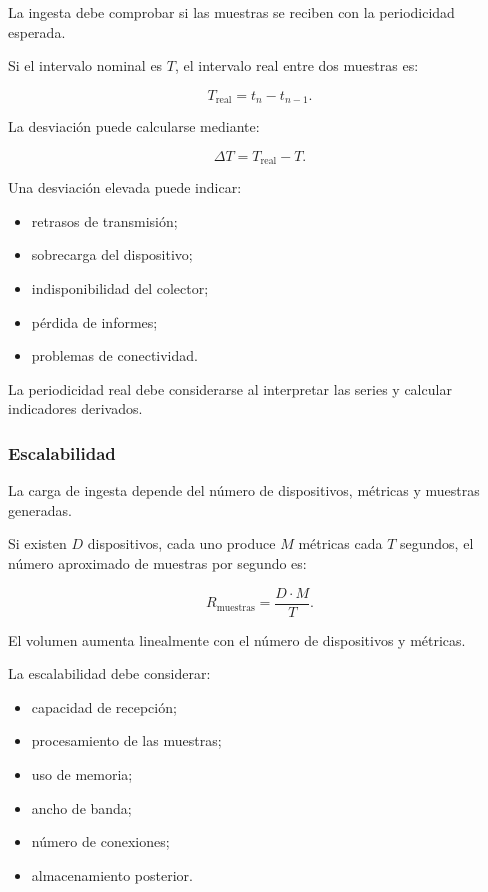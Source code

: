 La ingesta debe comprobar si las muestras se reciben con la periodicidad
esperada.

Si el intervalo nominal es \(T\), el intervalo real entre dos muestras
es:

\[
    T_{\mathrm{real}}
    =
    t_n
    -
    t_{n-1}.
\]

La desviación puede calcularse mediante:

\[
    \Delta T
    =
    T_{\mathrm{real}}
    -
    T.
\]

Una desviación elevada puede indicar:

\begin{itemize}
    \item retrasos de transmisión;

    \item sobrecarga del dispositivo;

    \item indisponibilidad del colector;

    \item pérdida de informes;

    \item problemas de conectividad.
\end{itemize}

La periodicidad real debe considerarse al interpretar las series y
calcular indicadores derivados.


\subsubsection*{Escalabilidad}

La carga de ingesta depende del número de dispositivos, métricas y
muestras generadas.

Si existen \(D\) dispositivos, cada uno produce \(M\) métricas cada \(T\)
segundos, el número aproximado de muestras por segundo es:

\[
    R_{\mathrm{muestras}}
    =
    \frac{
        D \cdot M
    }{
        T
    }.
\]

El volumen aumenta linealmente con el número de dispositivos y métricas.

La escalabilidad debe considerar:

\begin{itemize}
    \item capacidad de recepción;

    \item procesamiento de las muestras;

    \item uso de memoria;

    \item ancho de banda;

    \item número de conexiones;

    \item almacenamiento posterior.
\end{itemize}

